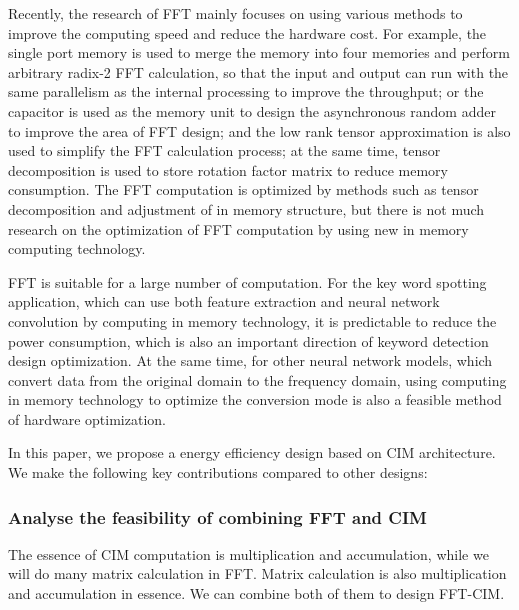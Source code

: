 \documentclass[journal]{IEEEtran}
\begin{document}
Recently, the research of FFT mainly focuses on using various methods to improve the computing speed and reduce the hardware cost. For example, the single port memory is used to merge the memory into four memories and perform arbitrary radix-2 FFT calculation, so that the input and output can run with the same parallelism as the internal processing to improve the throughput; or the capacitor is used as the memory unit to design the asynchronous random adder to improve the area of FFT design; and the low rank tensor approximation is also used to simplify the FFT calculation process; at the same time, tensor decomposition is used to store rotation factor matrix to reduce memory consumption. The FFT computation is optimized by methods such as tensor decomposition and adjustment of in memory structure, but there is not much research on the optimization of FFT computation by using new in memory computing technology\cite{12,13}.

FFT is suitable for a large number of computation. For the key word spotting application, which can use both feature extraction and neural network convolution by computing in memory technology, it is predictable to reduce the power consumption, which is also an important direction of keyword detection design optimization. At the same time, for other neural network models, which convert data from the original domain to the frequency domain, using computing in memory technology to optimize the conversion mode is also a feasible method of hardware optimization.

In this paper, we propose a energy efficiency design based on CIM architecture. We make the following key contributions compared to other designs:




\subsubsection{Analyse the feasibility of combining FFT and CIM}
The essence of CIM computation is multiplication and accumulation, while
we will do many matrix calculation in FFT. Matrix calculation is also multiplication and accumulation in essence. We can combine both of them to design FFT-CIM.
\end{document}
